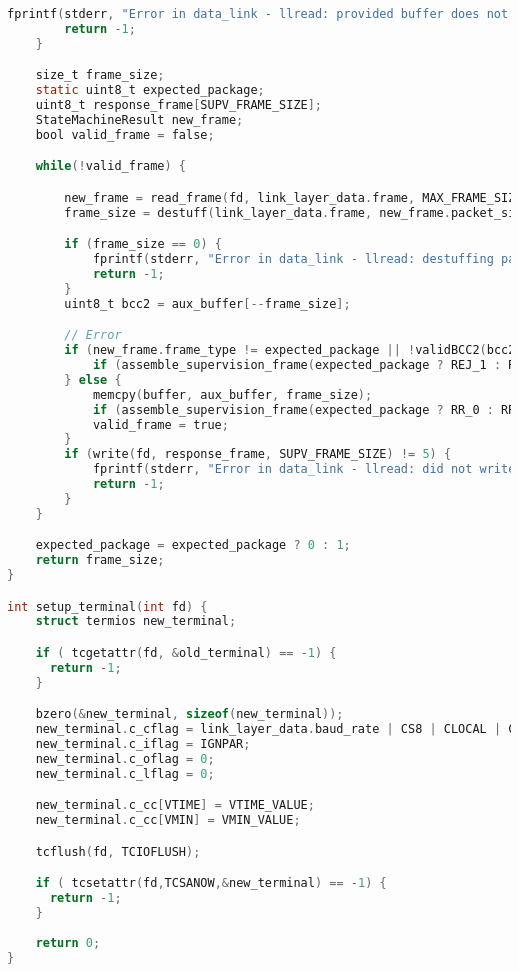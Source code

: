 \begin{lstlisting}[language=C, caption=data_link.c]
        fprintf(stderr, "Error in data_link - llread: provided buffer does not meet size requirements\n");
        return -1;
    }

    size_t frame_size;
    static uint8_t expected_package;
    uint8_t response_frame[SUPV_FRAME_SIZE];
    StateMachineResult new_frame;
    bool valid_frame = false;

    while(!valid_frame) {

        new_frame = read_frame(fd, link_layer_data.frame, MAX_FRAME_SIZE);
        frame_size = destuff(link_layer_data.frame, new_frame.packet_size, aux_buffer, MAX_PACKET_SIZE + 1);

        if (frame_size == 0) {
            fprintf(stderr, "Error in data_link - llread: destuffing packet unsuccessfull\n");
            return -1;
        }
        uint8_t bcc2 = aux_buffer[--frame_size];

        // Error
        if (new_frame.frame_type != expected_package || !validBCC2(bcc2, aux_buffer, frame_size)) {
            if (assemble_supervision_frame(expected_package ? REJ_1 : REJ_0, RECEIVER, response_frame) == -1) return -1;
        } else {
            memcpy(buffer, aux_buffer, frame_size);
            if (assemble_supervision_frame(expected_package ? RR_0 : RR_1, RECEIVER, response_frame) == -1) return -1;
            valid_frame = true;
        }
        if (write(fd, response_frame, SUPV_FRAME_SIZE) != 5) {
            fprintf(stderr, "Error in data_link - llread: did not write response frame correctly");
            return -1;
        }
    }

    expected_package = expected_package ? 0 : 1;
    return frame_size;
}

int setup_terminal(int fd) {
    struct termios new_terminal;

    if ( tcgetattr(fd, &old_terminal) == -1) {
      return -1;
    }

    bzero(&new_terminal, sizeof(new_terminal));
    new_terminal.c_cflag = link_layer_data.baud_rate | CS8 | CLOCAL | CREAD;
    new_terminal.c_iflag = IGNPAR;
    new_terminal.c_oflag = 0;
    new_terminal.c_lflag = 0;

    new_terminal.c_cc[VTIME] = VTIME_VALUE;
    new_terminal.c_cc[VMIN] = VMIN_VALUE;

    tcflush(fd, TCIOFLUSH);

    if ( tcsetattr(fd,TCSANOW,&new_terminal) == -1) {
      return -1;
    }
     
    return 0;
}


\end{lstlisting}
